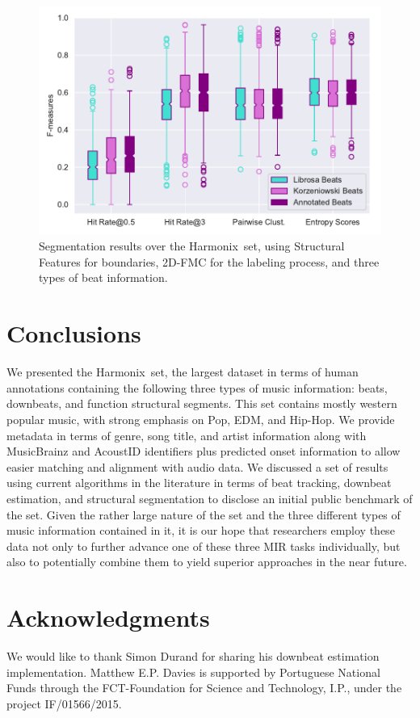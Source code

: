 \documentclass{article}
\newcommand{\setName}{Harmonix}
\begin{document}
\begin{figure}
    \centerline{\includegraphics[width=1.1\columnwidth]{figs/segment_results.pdf}}
    \caption{Segmentation results over the \setName~set, using Structural Features for boundaries, 2D-FMC for the labeling process, and three types of beat information.}
    \label{fig:segment_results}
\end{figure}

\section{Conclusions}\label{sec:conclusions}

We presented the \setName~set, the largest dataset in terms of human annotations containing the following three types of music information: beats, downbeats, and function structural segments.
This set contains mostly western popular music, with strong emphasis on Pop, EDM, and Hip-Hop.
We provide metadata in terms of genre, song title, and artist information along with MusicBrainz and AcoustID identifiers plus predicted onset information to allow easier matching and alignment with audio data.
We discussed a set of results using current algorithms in the literature in terms of beat tracking, downbeat estimation, and structural segmentation to disclose an initial public benchmark of the set.
Given the rather large nature of the set and the three different types of music information contained in it, it is our hope that researchers employ these data not only to further advance one of these three MIR tasks individually, but also to potentially combine them to yield superior approaches in the near future.

\section{Acknowledgments}

We would like to thank Simon Durand for sharing his downbeat estimation implementation.
Matthew E.P. Davies is supported by Portuguese National Funds through the FCT-Foundation for Science and Technology, I.P., under the project IF/01566/2015.

\balance

\end{document}
